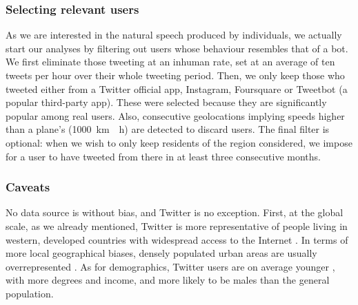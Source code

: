 \documentclass[../thesis.tex]{subfiles}
\begin{document}
\subsubsection{Selecting relevant users}
\label{sec:method_users_select}
As we are interested in the natural speech produced by individuals, we actually start
our analyses by filtering out users whose behaviour resembles that of a bot. We first
eliminate those tweeting at an inhuman rate, set at an average of ten tweets per hour
over their whole tweeting period. Then, we only keep those who tweeted either from a
Twitter official app, Instagram, Foursquare or Tweetbot (a popular third-party app).
These were selected because they are significantly popular among real users. Also,
consecutive geolocations implying speeds higher than a plane's (\SI{1000}{\kilo \meter
\per \hour}) are detected to discard users. The final filter is optional: when we wish
to only keep residents of the region considered, we impose for a user to have tweeted
from there in at least three consecutive months.


\subsubsection{Caveats}
No data source is without bias, and Twitter is no exception. First, at the global scale,
as we already mentioned, Twitter is more representative of people living in western,
developed countries with widespread access to the Internet
\cite{HawelkaGeolocatedTwitter2014,MocanuTwitterBabel2013}. In terms of more local
geographical biases, densely populated urban areas are usually overrepresented
\cite{MisloveUnderstandingDemographics2011,JiangUnderstandingDemographic2019,AuxierSocialMedia2021}.
As for demographics, Twitter users are on average younger
\cite{NguyenHowOld2013,AuxierSocialMedia2021,SloanWhoTweets2017}, with more degrees and
income, and more likely to be males
\cite{MisloveUnderstandingDemographics2011,AuxierSocialMedia2021,SloanWhoTweets2017} than the general population.

\end{document}
